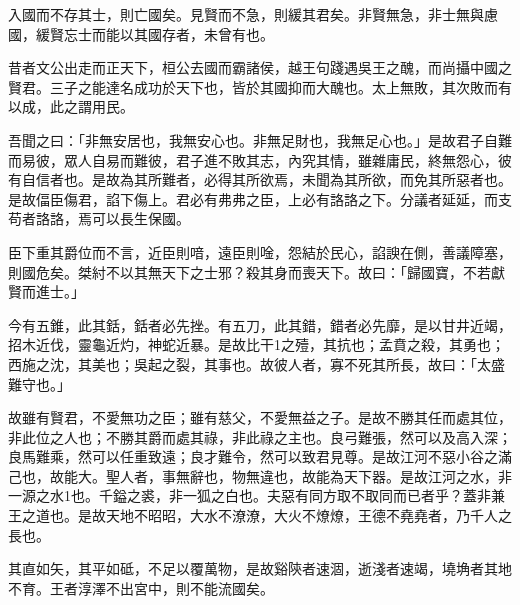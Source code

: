 
\begin{pinyinscope}
入國而不存其士，則亡國矣。見賢而不急，則緩其君矣。非賢無急，非士無與慮國，緩賢忘士而能以其國存者，未曾有也。

昔者文公出走而正天下，桓公去國而霸諸侯，越王句踐遇吳王之醜，而尚攝中國之賢君。三子之能達名成功於天下也，皆於其國抑而大醜也。太上無敗，其次敗而有以成，此之謂用民。

吾聞之曰：「非無安居也，我無安心也。非無足財也，我無足心也。」是故君子自難而易彼，眾人自易而難彼，君子進不敗其志，內究其情，雖雜庸民，終無怨心，彼有自信者也。是故為其所難者，必得其所欲焉，未聞為其所欲，而免其所惡者也。是故偪臣傷君，諂下傷上。君必有弗弗之臣，上必有詻詻之下。分議者延延，而支苟者詻詻，焉可以長生保國。

臣下重其爵位而不言，近臣則喑，遠臣則唫，怨結於民心，諂諛在側，善議障塞，則國危矣。桀紂不以其無天下之士邪？殺其身而喪天下。故曰：「歸國寶，不若獻賢而進士。」

今有五錐，此其銛，銛者必先挫。有五刀，此其錯，錯者必先靡，是以甘井近竭，招木近伐，靈龜近灼，神蛇近暴。是故比干1之殪，其抗也；孟賁之殺，其勇也；西施之沈，其美也；吳起之裂，其事也。故彼人者，寡不死其所長，故曰：「太盛難守也。」

故雖有賢君，不愛無功之臣；雖有慈父，不愛無益之子。是故不勝其任而處其位，非此位之人也；不勝其爵而處其祿，非此祿之主也。良弓難張，然可以及高入深；良馬難乘，然可以任重致遠；良才難令，然可以致君見尊。是故江河不惡小谷之滿己也，故能大。聖人者，事無辭也，物無違也，故能為天下器。是故江河之水，非一源之水1也。千鎰之裘，非一狐之白也。夫惡有同方取不取同而已者乎？蓋非兼王之道也。是故天地不昭昭，大水不潦潦，大火不燎燎，王德不堯堯者，乃千人之長也。

其直如矢，其平如砥，不足以覆萬物，是故谿陝者速涸，逝淺者速竭，墝埆者其地不育。王者淳澤不出宮中，則不能流國矣。


\end{pinyinscope}